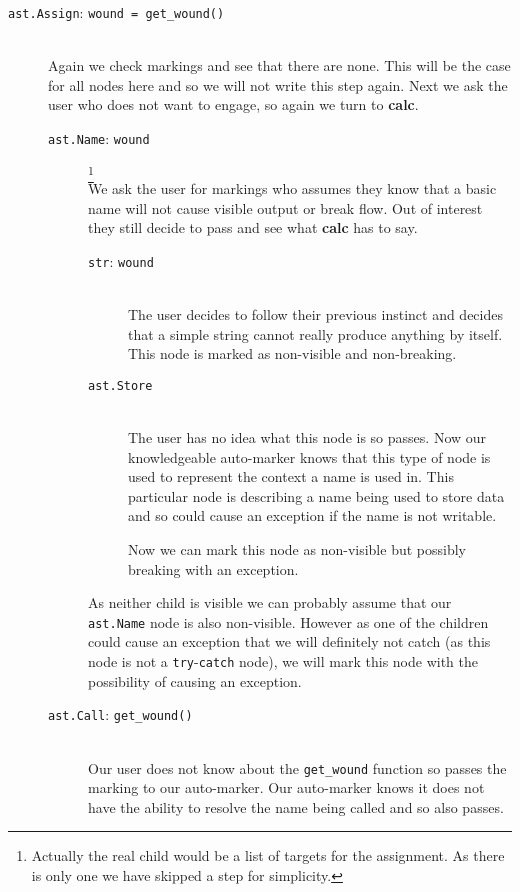 \documentclass[twoside,a4paper]{report}
\begin{document}
\begin{description}
  \item[\texttt{ast.Assign}: \texttt{wound = get\_wound()}] \hfill \\
  Again we check markings and see that there are none. This will be the case for all nodes here and so we will not write this step again.
  Next we ask the user who does not want to engage, so again we turn to \textbf{calc}.
  \begin{description}
    \item[\texttt{ast.Name}: \texttt{wound}]\footnote{Actually the real child would be a
    list of targets for the assignment. As there is only one we have skipped a step for simplicity.} \hfill \\
    We ask the user for markings who assumes they know that a basic name will not cause visible output or break flow. Out of interest they still
    decide to pass and see what \textbf{calc} has to say.
    \begin{description}
      \item[\texttt{str}: \texttt{wound}] \hfill \\
      The user decides to follow their previous instinct and decides that a simple string cannot really produce anything by itself. This node is
      marked as non-visible and non-breaking.

      \item[\texttt{ast.Store}] \hfill \\
      The user has no idea what this node is so passes. Now our knowledgeable auto-marker knows that this type of node is used to represent the context
      a name is used in. This particular node is describing a name being used to store data and so could cause an exception if the name is not writable.
      
      Now we can mark this node as non-visible but possibly breaking with an exception.
    \end{description}

    As neither child is visible we can probably assume that our \texttt{ast.Name} node is also non-visible. However as one of the children could cause an
    exception that we will definitely not catch (as this node is not a \texttt{try}-\texttt{catch} node), we will mark this node with the possibility
    of causing an exception.

    \item[\texttt{ast.Call}: \texttt{get\_wound()}] \hfill \\
    Our user does not know about the \texttt{get\_wound} function so passes the marking to our auto-marker. Our auto-marker knows it does not have
    the ability to resolve the name being called and so also passes.


\end{description}
\end{description}
\end{document}
